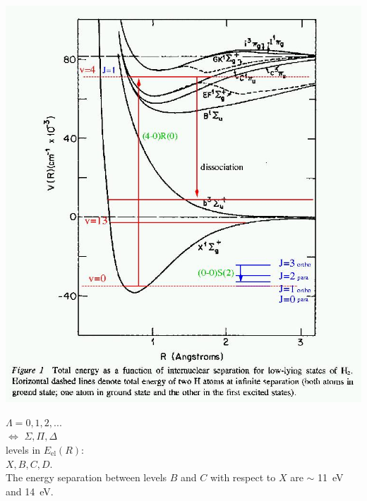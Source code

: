 \begin{frame}
\begin{minipage}[t]{0.59\textwidth}
\includegraphics[width=\textwidth,height=!]{./B/h2_levels_xv.jpg}
\end{minipage}
\hfill
\begin{minipage}[t]{0.39\textwidth}
\vspace{-6cm}
$\Lambda = 0, 1, 2, ... $\\ $\Leftrightarrow$ $ \Sigma, \Pi, \Delta$ \\
levels in  $E_\mathrm{el}(R)$:\\ $X,B,C,D$.\\

The energy separation between levels $B$ and $C$ with respect to $X$
are $\sim$ 11~eV and 14~eV.  \\
\end{minipage}
\vfill


\end{frame}
